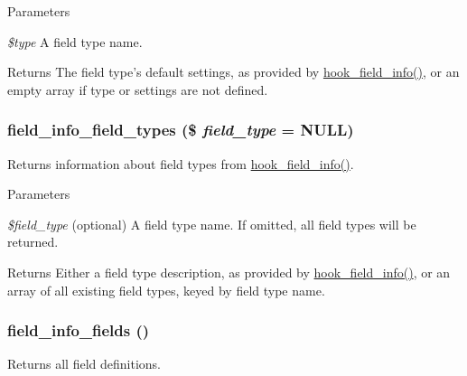 \begin{DoxyParams}{Parameters}
\item[{\em \$type}]A field type name.\end{DoxyParams}
\begin{DoxyReturn}{Returns}
The field type's default settings, as provided by \hyperlink{group__field__types_gad3eb779f26f41b520f19af011ece3eb1}{hook\_\-field\_\-info()}, or an empty array if type or settings are not defined. 
\end{DoxyReturn}
\hypertarget{group__field__info_ga7f5100daee334d9f76952cb49d7d3613}{
\subsubsection[{field\_\-info\_\-field\_\-types}]{\setlength{\rightskip}{0pt plus 5cm}field\_\-info\_\-field\_\-types (\$ {\em field\_\-type} = {\ttfamily NULL})}}
\label{group__field__info_ga7f5100daee334d9f76952cb49d7d3613}
Returns information about field types from \hyperlink{group__field__types_gad3eb779f26f41b520f19af011ece3eb1}{hook\_\-field\_\-info()}.


\begin{DoxyParams}{Parameters}
\item[{\em \$field\_\-type}](optional) A field type name. If omitted, all field types will be returned.\end{DoxyParams}
\begin{DoxyReturn}{Returns}
Either a field type description, as provided by \hyperlink{group__field__types_gad3eb779f26f41b520f19af011ece3eb1}{hook\_\-field\_\-info()}, or an array of all existing field types, keyed by field type name. 
\end{DoxyReturn}
\hypertarget{group__field__info_ga48e54378f3609753346fea1f7f3e7a2c}{
\subsubsection[{field\_\-info\_\-fields}]{\setlength{\rightskip}{0pt plus 5cm}field\_\-info\_\-fields ()}}
\label{group__field__info_ga48e54378f3609753346fea1f7f3e7a2c}
Returns all field definitions.

